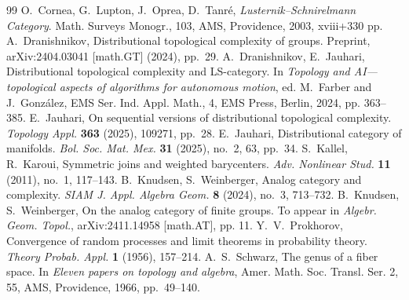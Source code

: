 \documentclass[10pt,a4paper]{amsart}
\theoremstyle{definition}
\begin{document}
\begin{thebibliography}{99}
 O.~Cornea, G.~Lupton, J.~Oprea, D.~Tanré, \emph{Lusternik--Schnirelmann Category}. Math. Surveys Monogr., 103, AMS, Providence, 2003, xviii+330 pp.
 A.~Dranishnikov, Distributional topological complexity of groups. Preprint, arXiv:2404.03041 [math.GT] (2024), pp.~29.
 A.~Dranishnikov, E.~Jauhari, Distributional topological complexity and LS-category. In \emph{Topology and AI---topological aspects of algorithms for autonomous motion}, ed. M.~Farber and J.~Gonz\'alez, EMS Ser. Ind. Appl. Math., 4, EMS Press, Berlin, 2024, pp. 363–385.
 E.~Jauhari, On sequential versions of distributional topological complexity. \emph{Topology Appl.} \textbf{363} (2025), 109271, pp.~28.
 E.~Jauhari, Distributional category of manifolds. \emph{Bol. Soc. Mat. Mex.} \textbf{31} (2025), no.~2, 63, pp.~34.
 S.~Kallel, R.~Karoui, Symmetric joins and weighted barycenters. \emph{Adv. Nonlinear Stud.} \textbf{11} (2011), no.~1, 117--143.
 B.~Knudsen, S.~Weinberger, Analog category and complexity. \emph{SIAM J. Appl. Algebra Geom.} \textbf{8} (2024), no.~3, 713--732.
 B.~Knudsen, S.~Weinberger, On the analog category of finite groups. To appear in \emph{Algebr. Geom. Topol.}, arXiv:2411.14958 [math.AT], pp. 11.
 Y.~V.~Prokhorov, Convergence of random processes and limit theorems in probability theory. \emph{Theory Probab. Appl.} \textbf{1} (1956), 157--214. 
 A.~S.~Schwarz, The genus of a fiber space. In \emph{Eleven papers on topology and algebra}, Amer. Math. Soc. Transl. Ser. 2, 55, AMS, Providence, 1966, pp.~49--140. 
\end{thebibliography}
\end{document}
